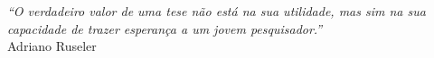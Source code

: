 \documentclass[
a5paper, %
twoside, %
english,
brazil,
chapter=TITLE, %
section=TITLE  %
]{ufsc-inep-thesis}
\begin{document}
\begin{epigrafe}
	\begin{flushright}
		\textit{``O verdadeiro valor de uma tese não está na sua utilidade, mas sim na sua capacidade de trazer esperança a um jovem pesquisador.''}\\
		Adriano Ruseler
	\end{flushright}	
			
		
				
\end{epigrafe}

\setlength{\absparsep}{18pt} %




\listoffigures*
\cleardoublepage

\listoftables*
\cleardoublepage





\tableofcontents*
\cleardoublepage


\textual






\end{document}
